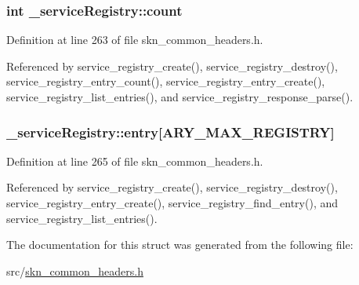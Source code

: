 \subsubsection[{\texorpdfstring{count}{count}}]{\setlength{\rightskip}{0pt plus 5cm}int \+\_\+service\+Registry\+::count}\hypertarget{struct__service_registry_a68062b14c6c9cb411e3602be664425bc}{}\label{struct__service_registry_a68062b14c6c9cb411e3602be664425bc}


Definition at line 263 of file skn\+\_\+common\+\_\+headers.\+h.



Referenced by service\+\_\+registry\+\_\+create(), service\+\_\+registry\+\_\+destroy(), service\+\_\+registry\+\_\+entry\+\_\+count(), service\+\_\+registry\+\_\+entry\+\_\+create(), service\+\_\+registry\+\_\+list\+\_\+entries(), and service\+\_\+registry\+\_\+response\+\_\+parse().

\subsubsection[{\texorpdfstring{entry}{entry}}]{ \+\_\+service\+Registry\+::entry\mbox{[}{\bf A\+R\+Y\+\_\+\+M\+A\+X\+\_\+\+R\+E\+G\+I\+S\+T\+RY}\mbox{]}}\hypertarget{struct__service_registry_ad35429e298009925477ba528ea500fe8}{}\label{struct__service_registry_ad35429e298009925477ba528ea500fe8}


Definition at line 265 of file skn\+\_\+common\+\_\+headers.\+h.



Referenced by service\+\_\+registry\+\_\+create(), service\+\_\+registry\+\_\+destroy(), service\+\_\+registry\+\_\+entry\+\_\+create(), service\+\_\+registry\+\_\+find\+\_\+entry(), and service\+\_\+registry\+\_\+list\+\_\+entries().



The documentation for this struct was generated from the following file\+:\begin{DoxyCompactItemize}
\item 
src/\hyperlink{skn__common__headers_8h}{skn\+\_\+common\+\_\+headers.\+h}\end{DoxyCompactItemize}
